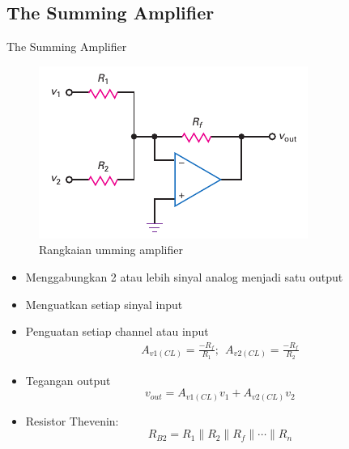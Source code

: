 \subsection{The Summing Amplifier}
\begin{frame}{The Summing Amplifier}
	\begin{multicols}{2}
		\begin{figure}
			\centering
			\includegraphics[width=0.9\linewidth]{gambar/fig-16.23a}
			\caption{Rangkaian umming amplifier}
			\label{fig-16.23a}
		\end{figure}
		\begin{itemize}
			\item Menggabungkan 2 atau lebih sinyal analog menjadi satu output
		\end{itemize}
		\columnbreak
		\begin{itemize}
			\item Menguatkan setiap sinyal input
			\item Penguatan setiap channel atau input
			\begin{align*}
				A_{v1(CL)} = \frac{-R_f}{R_1};~~ A_{v2(CL)} = \frac{-R_f}{R_2}
			\end{align*}
			\item Tegangan output
			\begin{equation}\label{pers.16.13}
				v_{out} = A_{v1(CL)}v_1 + A_{v2(CL)} v_2
			\end{equation}
			\item Resistor Thevenin:
			\begin{equation}
				R_{B2} = R_1 \parallel R_2 \parallel R_f \parallel \cdots \parallel R_n
			\end{equation}
		\end{itemize}
	\end{multicols}
\end{frame}

